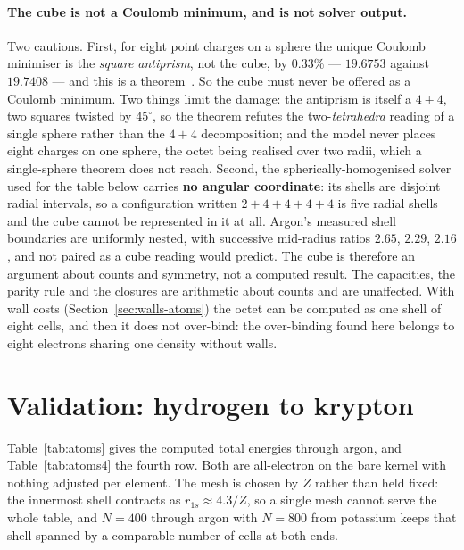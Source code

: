 \paragraph{The cube is not a Coulomb minimum, and is not solver output.}
Two cautions. First, for eight point charges on a sphere the unique Coulomb minimiser is the
\emph{square antiprism}, not the cube, by $0.33\%$ --- $19.6753$ against $19.7408$ --- and this is
a theorem~\cite{Thomson8}. So the cube must never be offered as a Coulomb minimum. Two things
limit the damage: the antiprism is itself a $4{+}4$, two squares twisted by $45^\circ$, so the
theorem refutes the two-\emph{tetrahedra} reading of a single sphere rather than the $4{+}4$
decomposition; and the model never places eight charges on one sphere, the octet being realised
over two radii, which a single-sphere theorem does not reach. Second, the spherically-homogenised
solver used for the table below carries \textbf{no angular coordinate}: its shells are disjoint
radial intervals, so a configuration written $2{+}4{+}4{+}4{+}4$ is five radial shells and the
cube cannot be represented in it at all. Argon's measured shell boundaries are uniformly nested,
with successive mid-radius ratios $2.65$, $2.29$, $2.16$, and not paired as a cube reading would
predict. The cube is therefore an argument about counts and symmetry, not a computed result. The
capacities, the parity rule and the closures are arithmetic about counts and are unaffected.
With wall costs (Section~\ref{sec:walls-atoms}) the octet can be computed as one shell of eight cells, and
then it does not over-bind: the over-binding found here belongs to eight electrons sharing one density
without walls.

\section{Validation: hydrogen to krypton}\label{sec:validation}

Table~\ref{tab:atoms} gives the computed total energies through argon, and
Table~\ref{tab:atoms4} the fourth row. Both are all-electron on the bare kernel with nothing
adjusted per element. The mesh is chosen by $Z$ rather than held fixed: the innermost shell
contracts as $r_{1s} \approx 4.3/Z$, so a single mesh cannot serve the whole table, and
$N = 400$ through argon with $N = 800$ from potassium keeps that shell spanned by a comparable
number of cells at both ends.

